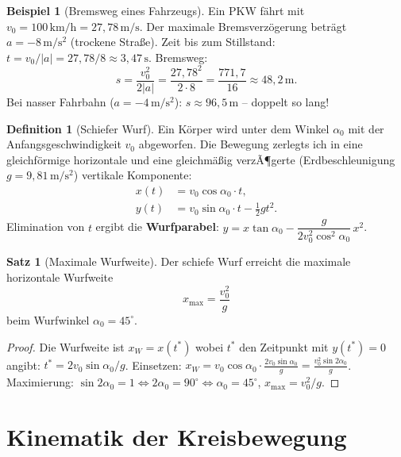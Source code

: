 ﻿\documentclass[a4paper,12pt]{report}
\theoremstyle{definition}
\newtheorem{definition}{Definition}
\newtheorem{beispiel}{Beispiel}
\newtheorem{satz}{Satz}
\begin{document}
\begin{beispiel}[Bremsweg eines Fahrzeugs]
Ein PKW f\"ahrt mit $v_0 = 100\,\mathrm{km/h} = 27{,}78\,\mathrm{m/s}$.
Der maximale Bremsverz\"ogerung betr\"agt $a = -8\,\mathrm{m/s^2}$ (trockene Stra\ss{}e).
Zeit bis zum Stillstand: $t = v_0/|a| = 27{,}78/8 \approx 3{,}47\,\mathrm{s}$.
Bremsweg:
\[
  s = \frac{v_0^2}{2|a|} = \frac{27{,}78^2}{2\cdot8} = \frac{771{,}7}{16} \approx 48{,}2\,\mathrm{m}.
\]
Bei nasser Fahrbahn ($a = -4\,\mathrm{m/s^2}$): $s \approx 96{,}5\,\mathrm{m}$ -- doppelt so lang!
\end{beispiel}

\begin{definition}[Schiefer Wurf]
Ein K\"orper wird unter dem Winkel $\alpha_0$ mit der Anfangsgeschwindigkeit $v_0$
abgeworfen. Die Bewegung zerlegts ich in eine gleichf\"ormige horizontale
und eine gleichm\"a\ss{}ig verzÃ¶gerte (Erdbeschleunigung $g = 9{,}81\,\mathrm{m/s^2}$)
vertikale Komponente:
\begin{align*}
  x(t) &= v_0\cos\alpha_0\cdot t, \\
  y(t) &= v_0\sin\alpha_0\cdot t - \tfrac{1}{2}g t^2.
\end{align*}
Elimination von $t$ ergibt die \textbf{Wurfparabel}:
$y = x\tan\alpha_0 - \dfrac{g}{2v_0^2\cos^2\alpha_0}\,x^2$.
\end{definition}

\begin{satz}[Maximale Wurfweite]
Der schiefe Wurf erreicht die maximale horizontale Wurfweite
\[
  x_{\max} = \frac{v_0^2}{g}
\]
beim Wurfwinkel $\alpha_0 = 45^\circ$.
\end{satz}
\begin{proof}
Die Wurfweite ist $x_W = x(t^*)$ wobei $t^*$ den Zeitpunkt mit $y(t^*) = 0$ angibt:
$t^* = 2v_0\sin\alpha_0/g$.
Einsetzen: $x_W = v_0\cos\alpha_0 \cdot \frac{2v_0\sin\alpha_0}{g}
= \frac{v_0^2\sin 2\alpha_0}{g}$.
Maximierung: $\sin 2\alpha_0 = 1 \Leftrightarrow 2\alpha_0 = 90^\circ \Leftrightarrow \alpha_0 = 45^\circ$,
$x_{\max} = v_0^2/g$.
\end{proof}

\section{Kinematik der Kreisbewegung}
\end{document}

